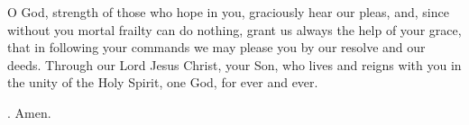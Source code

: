 \lettrine[lines=3]{O}{} God, strength of those who hope in you,
graciously hear our pleas,
and, since without you mortal frailty can do nothing,
grant us always the help of your grace,
that in following your commands
we may please you by our resolve and our deeds.
Through our Lord Jesus Christ, your Son,
who lives and reigns with you in the unity of the Holy Spirit,
one God, for ever and ever. \par \Rbar. Amen.

